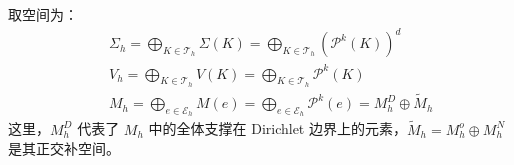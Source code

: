取空间为：
\begin{subequations}
	\begin{eqnarray}
		&& \Sigma_{h} = \bigoplus_{K \in \mathcal{T}_{h}} \Sigma(K) = \bigoplus_{K \in \mathcal{T}_{h}} \left(\mathscr{P}^{k}(K)\right)^{d} \\
		&& V_{h} = \bigoplus_{K \in \mathcal{T}_{h}} V(K) = \bigoplus_{K \in \mathcal{T}_{h}} \mathscr{P}^{k}(K) \\
		&& M_{h} = \bigoplus_{e \in \mathcal{E}_{h}} M(e) = \bigoplus_{e \in \mathcal{E}_{h}} \mathscr{P}^{k}(e) = M_{h}^{D} \oplus \widetilde{M}_{h}
	\end{eqnarray}
\end{subequations}
这里，\(M_{h}^{D}\) 代表了 \(M_{h}\) 中的全体支撑在 Dirichlet 边界上的元素，\(\widetilde{M}_{h} = M_{h}^{o}\oplus M_{h}^{N}\) 是其正交补空间。

